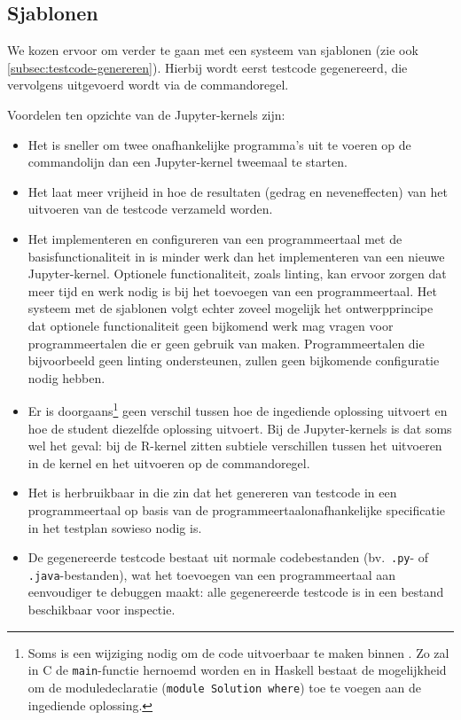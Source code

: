 \subsection{Sjablonen}\label{subsec:sjablonen}

We kozen ervoor om verder te gaan met een systeem van sjablonen (zie ook \cref{subsec:testcode-genereren}).
Hierbij wordt eerst testcode gegenereerd, die vervolgens uitgevoerd wordt via de commandoregel.

Voordelen ten opzichte van de Jupyter-kernels zijn:
\begin{itemize}
    \item Het is sneller om twee onafhankelijke programma's uit te voeren op de commandolijn dan een Jupyter-kernel tweemaal te starten.
    \item Het laat meer vrijheid in hoe de resultaten (gedrag en neveneffecten) van het uitvoeren van de testcode verzameld worden.
    \item Het implementeren en configureren van een programmeertaal met de basisfunctionaliteit in \tested{} is minder werk dan het implementeren van een nieuwe Jupyter-kernel.
    Optionele functionaliteit, zoals linting, kan ervoor zorgen dat meer tijd en werk nodig is bij het toevoegen van een programmeertaal.
    Het systeem met de sjablonen volgt echter zoveel mogelijk het ontwerpprincipe dat optionele functionaliteit geen bijkomend werk mag vragen voor programmeertalen die er geen gebruik van maken.
    Programmeertalen die bijvoorbeeld geen linting ondersteunen, zullen geen bijkomende configuratie nodig hebben.
    \item Er is doorgaans\footnote{Soms is een wijziging nodig om de code uitvoerbaar te maken binnen \tested{}. Zo zal in C de \texttt{main}-functie hernoemd worden en in Haskell bestaat de mogelijkheid om de moduledeclaratie (\texttt{module Solution where}) toe te voegen aan de ingediende oplossing.} geen verschil tussen hoe \tested{} de ingediende oplossing uitvoert en hoe de student diezelfde oplossing uitvoert.
    Bij de Jupyter-kernels is dat soms wel het geval: bij de R-kernel zitten subtiele verschillen tussen het uitvoeren in de kernel en het uitvoeren op de commandoregel.
    \item Het is herbruikbaar in die zin dat het genereren van testcode in een programmeertaal op basis van de programmeertaalonafhankelijke specificatie in het testplan sowieso nodig is.
    \item De gegenereerde testcode bestaat uit normale codebestanden (bv.\ \texttt{.py}- of \texttt{.java}-bestanden), wat het toevoegen van een programmeertaal aan \tested{} eenvoudiger te debuggen maakt: alle gegenereerde testcode is in een bestand beschikbaar voor inspectie.
\end{itemize}

